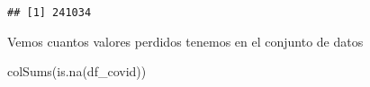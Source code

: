 \documentclass[
]{article}
\newenvironment{Shaded}{\begin{snugshade}}{\end{snugshade}}
\newcommand{\KeywordTok}[1]{\textcolor[rgb]{0.94,0.87,0.69}{#1}}
\newcommand{\NormalTok}[1]{\textcolor[rgb]{0.80,0.80,0.80}{#1}}
\newcommand{\OperatorTok}[1]{\textcolor[rgb]{0.94,0.94,0.82}{#1}}
\newcommand{\StringTok}[1]{\textcolor[rgb]{0.80,0.58,0.58}{#1}}
\begin{document}
\begin{Shaded}
\end{Shaded}

\begin{verbatim}
## [1] 241034
\end{verbatim}

Vemos cuantos valores perdidos tenemos en el conjunto de datos

\begin{Shaded}
\begin{Highlighting}[]
\KeywordTok{colSums}\NormalTok{(}\KeywordTok{is.na}\NormalTok{(df_covid))}
\end{Highlighting}
\end{Shaded}
\end{document}
